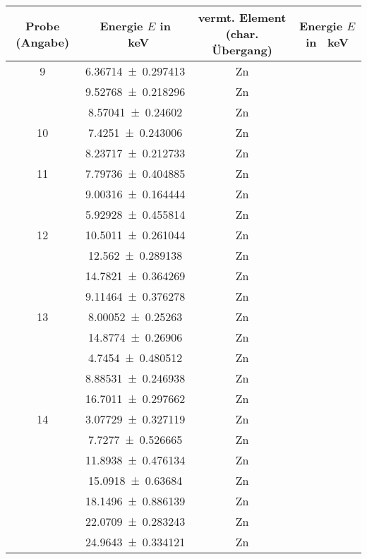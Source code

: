\documentclass[
	a4paper,
	12pt,
	pagesize,
	ngerman
]{scrartcl}
\begin{document}
	\begin{table}[H]
		\centering
		\begin{tabular}{ c | c || c | c }
			Probe (Angabe)&Energie $E$ in \SI{}{keV} & vermt. Element (char. Übergang) &  Energie $E$ in \SI{}{keV} \\ \hline \hline		
			9 & \SI{6.36714+-0.297413}{} &Zn &  \SI{}{} \\
			& \SI{9.52768+-0.218296}{} &Zn &  \SI{}{} \\
			& \SI{8.57041+-0.24602}{} &Zn &  \SI{}{} \\ \hline
			
			10 & \SI{7.4251+-0.243006}{} &Zn &  \SI{}{} \\
			& \SI{8.23717+-0.212733}{} &Zn &  \SI{}{} \\ \hline
			
			11 & \SI{7.79736+-0.404885}{} &Zn &  \SI{}{} \\
			& \SI{9.00316+-0.164444}{} &Zn &  \SI{}{} \\
			& \SI{5.92928+-0.455814}{} &Zn &  \SI{}{} \\ \hline
			
			12 & \SI{10.5011+-0.261044}{} &Zn &  \SI{}{} \\
			& \SI{12.562+-0.289138}{} &Zn &  \SI{}{} \\
			& \SI{14.7821+-0.364269}{} &Zn &  \SI{}{} \\
			& \SI{9.11464+-0.376278}{} &Zn &  \SI{}{} \\ \hline
			
			13 & \SI{8.00052+-0.25263}{} &Zn &  \SI{}{} \\
			& \SI{14.8774+-0.26906}{} &Zn &  \SI{}{} \\
			& \SI{4.7454+-0.480512}{} &Zn &  \SI{}{} \\
			& \SI{8.88531+-0.246938}{} &Zn &  \SI{}{} \\
			& \SI{16.7011+-0.297662}{} &Zn &  \SI{}{} \\ \hline
			
			14 & \SI{3.07729+-0.327119}{} &Zn &  \SI{}{} \\
			& \SI{7.7277+-0.526665}{} &Zn &  \SI{}{} \\
			& \SI{11.8938+-0.476134}{} &Zn &  \SI{}{} \\
			& \SI{15.0918+-0.63684}{} &Zn &  \SI{}{} \\
			& \SI{18.1496+-0.886139}{} &Zn &  \SI{}{} \\
			& \SI{22.0709+-0.283243}{} &Zn &  \SI{}{} \\
			& \SI{24.9643+-0.334121}{} &Zn &  \SI{}{} \\ \hline
			

\end{tabular}
\end{table}
\end{document}
